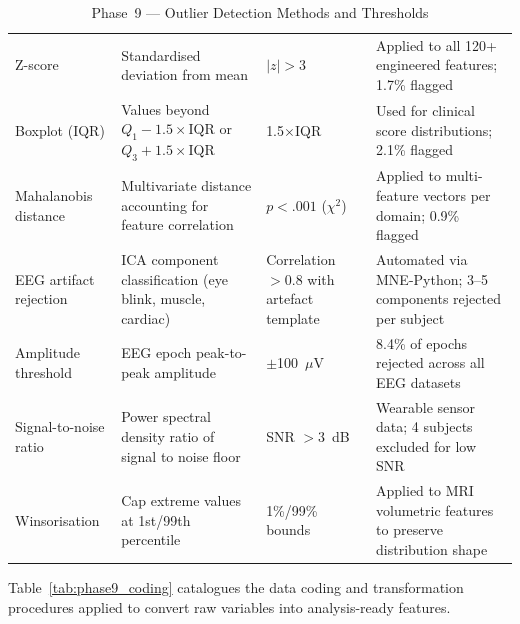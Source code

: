 \begingroup\singlespacing\tablefontsize\tablestripes
\begin{xltabular}{\textwidth}{@{} p{0.18\textwidth} X p{0.14\textwidth} p{0.28\textwidth} @{}}
\caption{Phase~9 --- Outlier Detection Methods and Thresholds}
\label{tab:phase9_outliers}\\
\toprule
{} &  &  &  \\
\midrule
\endfirsthead
\endhead
\bottomrule
\endlastfoot
Z-score               & Standardised deviation from mean                            & $|z| > 3$                & Applied to all 120+ engineered features; 1.7\% flagged \\
\addlinespace
Boxplot (IQR)         & Values beyond $Q_1 - 1.5 \times \text{IQR}$ or $Q_3 + 1.5 \times \text{IQR}$ & 1.5$\times$IQR         & Used for clinical score distributions; 2.1\% flagged \\
\addlinespace
Mahalanobis distance  & Multivariate distance accounting for feature correlation      & $p < .001$ ($\chi^2$)    & Applied to multi-feature vectors per domain; 0.9\% flagged \\
\addlinespace
EEG artifact rejection & ICA component classification (eye blink, muscle, cardiac)    & Correlation $> 0.8$ with artefact template & Automated via MNE-Python; 3--5 components rejected per subject \\
\addlinespace
Amplitude threshold   & EEG epoch peak-to-peak amplitude                             & $\pm$100~$\mu$V          & 8.4\% of epochs rejected across all EEG datasets \\
\addlinespace
Signal-to-noise ratio & Power spectral density ratio of signal to noise floor        & SNR $> 3$~dB             & Wearable sensor data; 4 subjects excluded for low SNR \\
\addlinespace
Winsorisation         & Cap extreme values at 1st/99th percentile                    & 1\%/99\% bounds          & Applied to MRI volumetric features to preserve distribution shape \\
\end{xltabular}
\endgroup

\vspace{1.5em}

Table~\ref{tab:phase9_coding} catalogues the data coding and transformation procedures applied to convert raw variables into analysis-ready features.

